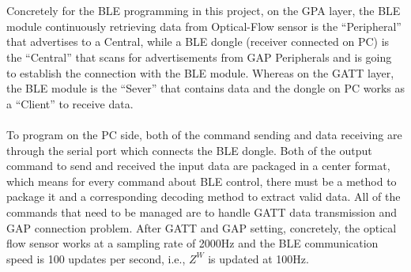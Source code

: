 \\\\%
Concretely for the BLE programming in this project, on the GPA layer, the BLE module continuously retrieving data from Optical-Flow sensor is the \enquote{Peripheral} that advertises to a Central, while a BLE dongle (receiver connected on PC) is the \enquote{Central} that scans for advertisements from GAP Peripherals and is going to establish the connection with the BLE module. Whereas on the GATT layer, the BLE module is the \enquote{Sever} that contains data and the dongle on PC works as a \enquote{Client} to receive data.
\\\\%
To program on the PC side, both of the command sending and data receiving are through the serial port which connects the BLE dongle. Both of the output command to send and received the input data are packaged in a center format, which means for every command about BLE control, there must be a method to package it and a corresponding decoding method to extract valid data. All of the commands that need to be managed are to handle GATT data transmission and GAP connection problem. After GATT and GAP setting, concretely, the optical flow sensor works at a sampling rate of 2000Hz and the BLE communication speed is 100 updates per second, i.e., \(Z^W\) is updated at 100Hz.
%
%
